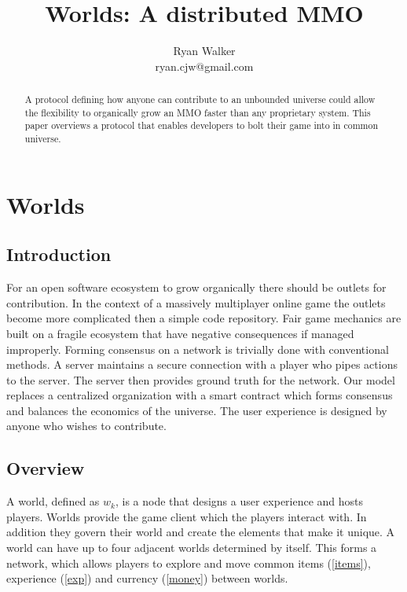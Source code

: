 \documentclass[runningheads,a4paper]{llncs}
\begin{document}
\def \SystemName {Worlds} %

\mainmatter  %

\title{\SystemName: A distributed MMO}

\author{Ryan Walker\\
				ryan.cjw@gmail.com}

\institute{} %

\maketitle

\begin{abstract}
A protocol defining how anyone can contribute to an unbounded universe could allow the flexibility to organically grow an MMO faster than any proprietary system. This paper overviews a protocol that enables developers to bolt their game into in common universe. 
\end{abstract}

\section{Worlds}
\subsection{Introduction}
For an open software ecosystem to grow organically there should be outlets for contribution. In the context of a massively multiplayer online game the outlets become more complicated then a simple code repository. Fair game mechanics are built on a fragile ecosystem that have negative consequences if managed improperly. Forming consensus on a network is trivially done with conventional methods. A server maintains a secure connection with a player who pipes actions to the server. The server then provides ground truth for the network. Our model replaces a centralized organization with a smart contract which forms consensus and balances the economics of the universe. The user experience is designed by anyone who wishes to contribute.

\subsection{Overview}
A world, defined as $w_k$, is a node that designs a user experience and hosts players. Worlds provide the game client which the players interact with. In addition they govern their world and create the elements that make it unique. A world can have up to four adjacent worlds determined by itself. This forms a network, which allows players to explore and move common items (\ref{items}), experience (\ref{exp}) and currency (\ref{money}) between worlds.
\end{document}
